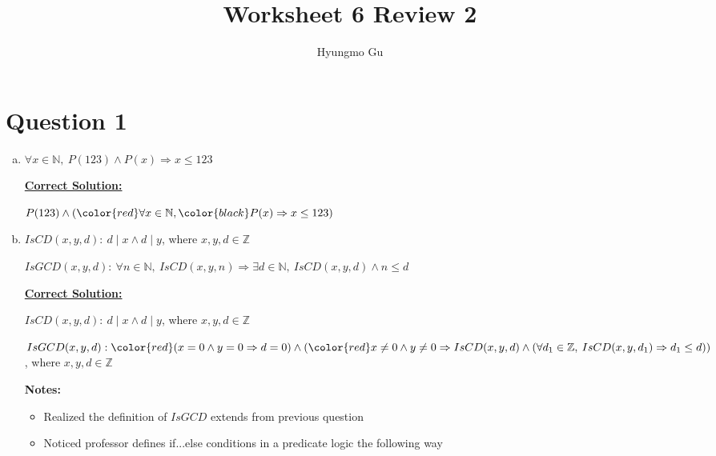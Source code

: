 \documentclass[12pt]{article}
\begin{document}
\title{Worksheet 6 Review 2}
\author{Hyungmo Gu}
\maketitle

\section*{Question 1}
\begin{enumerate}[a.]
    \item

    $\forall x \in \mathbb{N},\:P(123) \land P(x) \Rightarrow x \leq 123$

    \bigskip

    \begin{mdframed}
        \underline{\textbf{Correct Solution:}}

        \bigskip

        $P(123) \land (\color{red}\forall x \in \mathbb{N},\color{black} P(x) \Rightarrow x \leq 123)$
    \end{mdframed}

    \item

    $IsCD(x,y,d):\:d \mid x \land d \mid y$, where $x,y,d \in \mathbb{Z}$

    \bigskip

    $IsGCD(x,y,d):\:\forall n \in \mathbb{N},\:IsCD(x,y,n) \Rightarrow \exists d
    \in \mathbb{N},\:IsCD(x,y,d) \land n \leq d$

    \bigskip

    \begin{mdframed}
        \underline{\textbf{Correct Solution:}}

        \bigskip

        $IsCD(x,y,d):\:d \mid x \land d \mid y$, where $x,y,d \in \mathbb{Z}$

        \bigskip

        $IsGCD(x,y,d):\color{red}(x = 0 \land y = 0 \Rightarrow d = 0)
        \land (\color{red}x \neq 0 \land y \neq 0 \Rightarrow IsCD(x,y,d) \land (\forall d_1 \in \mathbb{Z},\:IsCD(x,y,d_1) \Rightarrow d_1 \leq d))$, \color{red}where $x,y,d \in \mathbb{Z}$\color{black}
    \end{mdframed}

    \bigskip

    \textbf{Notes:}

    \begin{itemize}
        \item Realized the definition of $IsGCD$ extends from previous question
        \item Noticed professor defines if...else conditions in a predicate logic the following way


\end{itemize}
\end{enumerate}
\end{document}
